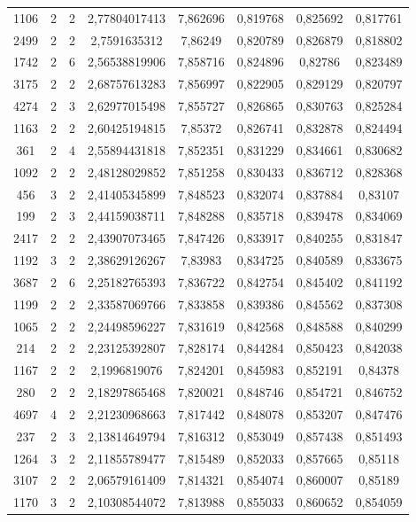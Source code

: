 \begin{longtable}{|c|c|c|c|c|c|c|c|}
1106 & 2 & 2 & 2,77804017413 & 7,862696 & 0,819768 & 0,825692 & 0,817761 \\
2499 & 2 & 2 & 2,7591635312 & 7,86249 & 0,820789 & 0,826879 & 0,818802 \\
1742 & 2 & 6 & 2,56538819906 & 7,858716 & 0,824896 & 0,82786 & 0,823489 \\
3175 & 2 & 2 & 2,68757613283 & 7,856997 & 0,822905 & 0,829129 & 0,820797 \\
4274 & 2 & 3 & 2,62977015498 & 7,855727 & 0,826865 & 0,830763 & 0,825284 \\
1163 & 2 & 2 & 2,60425194815 & 7,85372 & 0,826741 & 0,832878 & 0,824494 \\
361 & 2 & 4 & 2,55894431818 & 7,852351 & 0,831229 & 0,834661 & 0,830682 \\
1092 & 2 & 2 & 2,48128029852 & 7,851258 & 0,830433 & 0,836712 & 0,828368 \\
456 & 3 & 2 & 2,41405345899 & 7,848523 & 0,832074 & 0,837884 & 0,83107 \\
199 & 2 & 3 & 2,44159038711 & 7,848288 & 0,835718 & 0,839478 & 0,834069 \\
2417 & 2 & 2 & 2,43907073465 & 7,847426 & 0,833917 & 0,840255 & 0,831847 \\
1192 & 3 & 2 & 2,38629126267 & 7,83983 & 0,834725 & 0,840589 & 0,833675 \\
3687 & 2 & 6 & 2,25182765393 & 7,836722 & 0,842754 & 0,845402 & 0,841192 \\
1199 & 2 & 2 & 2,33587069766 & 7,833858 & 0,839386 & 0,845562 & 0,837308 \\
1065 & 2 & 2 & 2,24498596227 & 7,831619 & 0,842568 & 0,848588 & 0,840299 \\
214 & 2 & 2 & 2,23125392807 & 7,828174 & 0,844284 & 0,850423 & 0,842038 \\
1167 & 2 & 2 & 2,1996819076 & 7,824201 & 0,845983 & 0,852191 & 0,84378 \\
280 & 2 & 2 & 2,18297865468 & 7,820021 & 0,848746 & 0,854721 & 0,846752 \\
4697 & 4 & 2 & 2,21230968663 & 7,817442 & 0,848078 & 0,853207 & 0,847476 \\
237 & 2 & 3 & 2,13814649794 & 7,816312 & 0,853049 & 0,857438 & 0,851493 \\
1264 & 3 & 2 & 2,11855789477 & 7,815489 & 0,852033 & 0,857665 & 0,85118 \\
3107 & 2 & 2 & 2,06579161409 & 7,814321 & 0,854074 & 0,860007 & 0,85189 \\
1170 & 3 & 2 & 2,10308544072 & 7,813988 & 0,855033 & 0,860652 & 0,854059 \\

\end{longtable}
